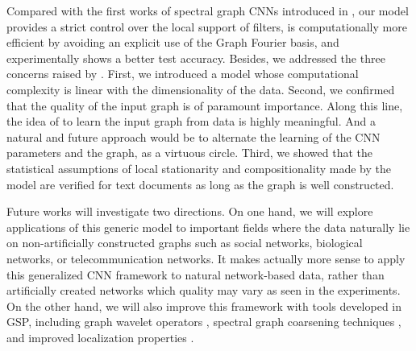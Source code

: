 \documentclass{article}
\newcommand{\bruna}{art:BrunaZarembaSzlamLeCun13DLgraphs,
art:HenaffBrunaLeCun15DLgraphs}
\newcommand{\todo}[1]{{\color{red} #1 }}
\begin{document}
Compared with the first works of spectral graph CNNs
introduced in \cite{\bruna}, our model provides a strict control over the local
support of filters, is computationally more efficient by
avoiding an explicit use of the Graph Fourier basis, and experimentally shows a
better test accuracy. Besides, we addressed the three concerns raised by
\cite{art:HenaffBrunaLeCun15DLgraphs}. First, we introduced a model whose computational complexity is linear with the
dimensionality of the data. Second, we confirmed that the quality of the input graph is of paramount importance. Along this line, the idea of \cite{art:HenaffBrunaLeCun15DLgraphs} to learn the input graph from data is highly meaningful. And a natural and future approach would be to alternate the learning of the CNN parameters and the graph, as a virtuous circle. Third, we showed that the statistical assumptions of local stationarity and compositionality made by the model are verified for text documents as long as the graph is well constructed.


Future works will investigate two directions. On one hand, we will explore
applications of this generic model to important fields where the data naturally
lie on non-artificially constructed graphs such as social networks, biological
networks, or telecommunication networks. It makes actually more sense to apply
this generalized CNN framework to natural network-based data, rather than
artificially created networks which quality may vary as seen in the experiments.
On the other hand, we will also improve this framework with tools developed in GSP,
including graph wavelet operators
\cite{art:HammondVandergheynstGribonval11GraphWav, art:CoifmanLafon06DifMap,
	pro:GavishNadlerCoifman10GraphHaar, pro:ChenChengMallat14deepHaar,
	pro:RustamovGuibas14deepHaar}, spectral graph coarsening techniques
	\cite{art:ShumanFarajiVandergheynst16PyramTrans}, and improved localization
	properties \cite{pro:TsitsveroBarbarossa15Uncert,
	pro:PasdeloupAlamiGriponRabbat15Uncert,
art:PerraudinRicaudShumanVandergheynst16Uncert}.













\newpage

%

\end{document}
